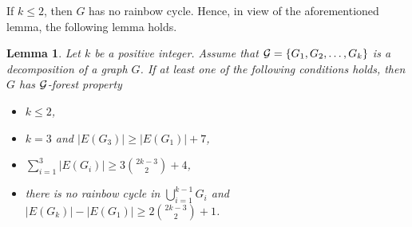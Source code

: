 \documentclass[11pt]{article}
\newtheorem{prelem}{{\bf Lemma}}
\newenvironment{lem}{\begin{prelem}{\hspace{-0.5
               em}{\bf.\ }}}{\end{prelem}}
\begin{document}
If $k\leq 2$, then $G$ has no rainbow cycle. Hence, in view of the aforementioned lemma, the following lemma holds. 
\begin{lem}\label{lastlem}
Let $k$ be a positive integer. 
Assume that ${\cal G}=\{G_1,G_2,\ldots,G_k\}$ is a 
decomposition of a graph $G$. If at least one of the following conditions holds, then $G$ has ${\cal G}$-forest property
\begin{itemize}
\item $k\leq 2$, 

\item  $k=3$ and $|E(G_3)|\geq  |E(G_1)|+7$,

\item $\displaystyle\sum_{i=1}^{3}|E(G_i)|\geq  {3}
{2k-3\choose 2}+4$,

\item there is no rainbow cycle in $\displaystyle\bigcup_{i=1}^{k-1}G_i$ and $|E(G_k)|-|E(G_1)|\geq 2\displaystyle {2k-3\choose 2}+1$.
\end{itemize}
\end{lem}
\end{document}
